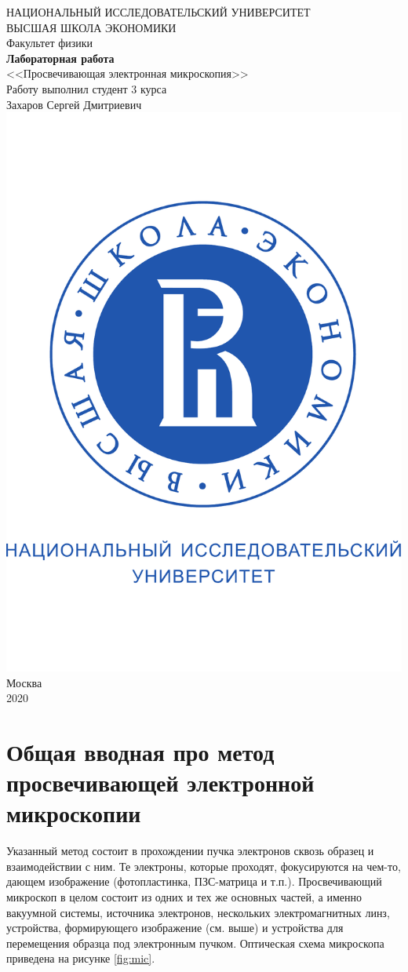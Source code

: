 \documentclass[a4paper, 12pt]{article}
\begin{document}
	\begin{titlepage}
		\begin{center}
			$$$$
			$$$$
			$$$$
			$$$$
			{\Large{НАЦИОНАЛЬНЫЙ ИССЛЕДОВАТЕЛЬСКИЙ УНИВЕРСИТЕТ}}\\
			\vspace{0.1cm}
			{\Large{ВЫСШАЯ ШКОЛА ЭКОНОМИКИ}}\\
			\vspace{0.25cm}
			{\large{Факультет физики}}\\
			\vspace{4cm}
			{\Huge\textbf{{Лабораторная работа}}}\\%
			\vspace{1cm}
			{\LARGE{<<Просвечивающая электронная микроскопия>>}}\\%
			\vspace{2cm}
			{Работу выполнил студент 3 курса}\\
			{Захаров Сергей Дмитриевич}
			\vfill
			\includegraphics[width=0.2\linewidth]{HSElogo}
			\vfill
			Москва\\
			2020
		\end{center}
	\end{titlepage}

\tableofcontents

\newpage

\section{Общая вводная про метод просвечивающей электронной микроскопии}

Указанный метод состоит в прохождении пучка электронов сквозь образец и взаимодействии с ним. Те электроны, которые проходят, фокусируются на чем-то, дающем изображение (фотопластинка, ПЗС-матрица и т.п.). Просвечивающий микроскоп в целом состоит из одних и тех же основных частей, а именно вакуумной системы, источника электронов, нескольких электромагнитных линз, устройства, формирующего изображение (см. выше) и устройства для перемещения образца под электронным пучком. Оптическая схема микроскопа приведена на рисунке \ref{fig:mic}.
\end{document}
